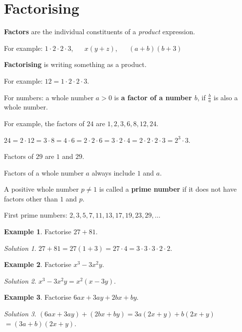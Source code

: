 \documentclass[
  12pt,
  oneside]{book}
\theoremstyle{definition}
\theoremstyle{definition}
\newtheorem{example}{Example}[chapter]
\theoremstyle{definition}
\theoremstyle{definition}
\theoremstyle{remark}
\newtheorem*{solution}{Solution}
\begin{document}
\section{Factorising}\label{factorising-1}

\textbf{Factors} are the individual constituents of a \emph{product} expression.

For example: \(1\cdot 2\cdot 2\cdot 3\), ~~ \(x(y+z)\), ~~ \((a+b)(b+3)\)

\textbf{Factorising} is writing something as a product.

For example: \(12 = 1\cdot 2\cdot 2\cdot 3\).

For numbers: a whole number \(a>0\) is \textbf{a factor of a number \(b\)}, if \(\frac{b}{a}\) is also a whole number.

For example, the factors of \(24\) are \(1,2,3,6,8,12,24\).

\(24 = 2\cdot 12 = 3\cdot 8 = 4\cdot 6 = 2\cdot 2\cdot 6 = 3\cdot2\cdot 4 = 2\cdot 2\cdot 2\cdot 3 = 2^3\cdot 3\).

Factors of \(29\) are \(1\) and \(29\).

Factors of a whole number \(a\) always include \(1\) and \(a\).

A positive whole number \(p\neq1\) is called a \textbf{prime number} if it does not have factors other than \(1\) and \(p\).

First prime numbers: \(2,3,5,7,11,13,17,19,23,29,\dots\)

\begin{example}
Factorise \(27+81\).
\end{example}

\begin{solution}
\(27+81 = 27(1+3)=27\cdot 4 = 3\cdot3\cdot3\cdot2\cdot2\).
\end{solution}

\begin{example}
Factorise \(x^3-3x^2y\).
\end{example}

\begin{solution}
\(x^3-3x^2y = x^2(x-3y)\).
\end{solution}

\begin{example}
Factorise \(6ax+3ay+2bx+by\).
\end{example}

\begin{solution}
\((6ax+3ay)+(2bx+by) = 3a(2x+y)+b(2x+y)\) \(=(3a+b)(2x+y)\).
\end{solution}
\end{document}
